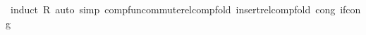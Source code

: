 \begin{isabellebody}
\ {\isacharparenleft}{\kern0pt}induct\ R{\isacharparenright}{\kern0pt}\ {\isacharparenleft}{\kern0pt}auto\ simp{\isacharcolon}{\kern0pt}\ comp{\isacharunderscore}{\kern0pt}fun{\isacharunderscore}{\kern0pt}commute{\isacharunderscore}{\kern0pt}relcomp{\isacharunderscore}{\kern0pt}fold\ insert{\isacharunderscore}{\kern0pt}relcomp{\isacharunderscore}{\kern0pt}fold\ cong{\isacharcolon}{\kern0pt}\ if{\isacharunderscore}{\kern0pt}cong{\isacharparenright}{\kern0pt}\isanewline
{}\isamarkupfalse%
%
\endisatagproof
{\isafoldproof}%
%
\isadelimproof
\isanewline
%
\endisadelimproof
%
\isadelimtheory
\isanewline
%
\endisadelimtheory
%
\isatagtheory
{}\isamarkupfalse%
%
\endisatagtheory
{\isafoldtheory}%
%
\isadelimtheory
%
\endisadelimtheory
%
\end{isabellebody}%
\endinput
